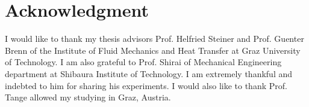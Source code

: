 \documentclass[conference]{IEEEtran}
\begin{document}
%
%
%
%
%
\section*{Acknowledgment}
I would like to thank my thesis advisors Prof. Helfried Steiner and Prof. Guenter Brenn of the Institute of Fluid Mechanics and Heat Transfer at Graz University of Technology.
I am also grateful to Prof. Shirai of Mechanical Engineering department at Shibaura Institute of Technology.
I am extremely thankful and indebted to him for sharing his experiments.
I would also like to thank Prof. Tange allowed my studying in Graz, Austria.
\end{document}

